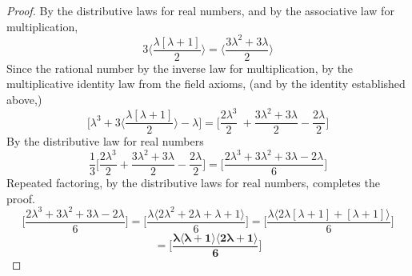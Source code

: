 \documentclass[preview]{standalone}
\begin{document}
\begin{proof}
    By the distributive laws for real numbers, 
    and by the associative law for multiplication,
    \begin{equation*}
        3 \bigg \langle \frac{ \lambda [ \lambda + 1 ] }{2} \bigg \rangle 
            = 
        \bigg \langle \frac{3 \lambda ^2 + 3 \lambda }{2} \bigg \rangle
    \end{equation*}
    Since the rational number  
    by the inverse law for multiplication, 
    by the multiplicative identity law from the field axioms,
    (and by the identity established above,)
    \begin{equation*} 
            \bigg[ 
                \lambda ^3 
                    + 
                3 \bigg \langle \frac{ \lambda [ \lambda + 1 ] }{2} \bigg \rangle
                    - 
                \lambda 
            \bigg]
            =
            \bigg[
                \frac{ 2 \lambda ^3 }{2} \
                    + 
                \frac{ 3 \lambda ^2 + 3 \lambda }{2} 
                    - 
                \frac{ 2 \lambda }{2}
            \bigg]
    \end{equation*}
    By the distributive law for real numbers
    \begin{equation*}
            \frac{1}{3}
            \bigg[
                \frac{ 2 \lambda ^3 }{2} 
                    + 
                \frac{ 3 \lambda ^2 + 3 \lambda }{2} 
                    - 
                \frac{ 2 \lambda }{2}
            \bigg]
                =
            \bigg[
                \frac{ 2 \lambda ^3 + 3 \lambda ^2 + 3 \lambda - 2 \lambda }
                {6}
            \bigg]
    \end{equation*}
    Repeated factoring, 
    by the distributive laws for real numbers,
    completes the proof.
    \begin{equation*}
        \bigg[
            \frac{ 2 \lambda ^3 + 3 \lambda ^2 + 3 \lambda - 2 \lambda }{6}
        \bigg]
            =
        \bigg[
            \frac{ \lambda \langle 2 \lambda ^2 + 2 \lambda + \lambda + 1 \rangle }{6}
        \bigg]
            =
        \bigg[
            \frac{ \lambda \langle 2 \lambda [\lambda + 1] + [\lambda + 1] \rangle }{6}
        \bigg]
    \end{equation*}
    \begin{equation*}
            =
        \bm{
            \bigg[
                \frac{ \lambda \langle \lambda + 1 \rangle \langle 2 \lambda + 1 \rangle }{6}
            \bigg]
        }
    \end{equation*}
\color{lightgray} \end{proof}
\end{document}
